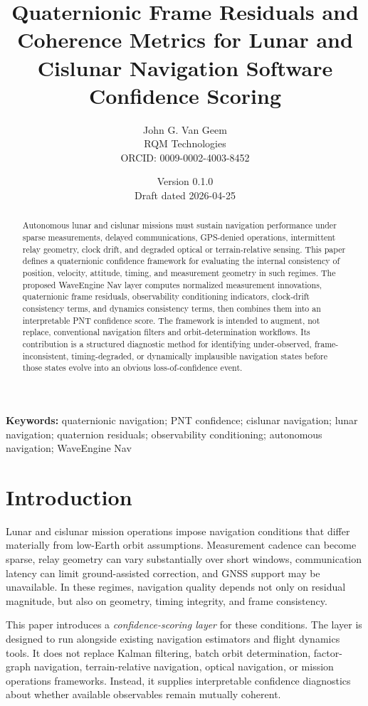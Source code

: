 \documentclass[11pt]{article}
\title{\textbf{Quaternionic Frame Residuals and Coherence Metrics for Lunar and Cislunar Navigation Software Confidence Scoring}}
\author{John G. Van Geem\\
RQM Technologies\\
ORCID: 0009-0002-4003-8452}
\date{Version 0.1.0 \\ Draft dated 2026-04-25}
\theoremstyle{remark}
\begin{document}
\maketitle

\begin{abstract}
Autonomous lunar and cislunar missions must sustain navigation performance under sparse measurements, delayed communications, GPS-denied operations, intermittent relay geometry, clock drift, and degraded optical or terrain-relative sensing. This paper defines a quaternionic confidence framework for evaluating the internal consistency of position, velocity, attitude, timing, and measurement geometry in such regimes. The proposed WaveEngine Nav layer computes normalized measurement innovations, quaternionic frame residuals, observability conditioning indicators, clock-drift consistency terms, and dynamics consistency terms, then combines them into an interpretable PNT confidence score. The framework is intended to augment, not replace, conventional navigation filters and orbit-determination workflows. Its contribution is a structured diagnostic method for identifying under-observed, frame-inconsistent, timing-degraded, or dynamically implausible navigation states before those states evolve into an obvious loss-of-confidence event.
\end{abstract}

\noindent\textbf{Keywords:} quaternionic navigation; PNT confidence; cislunar navigation; lunar navigation; quaternion residuals; observability conditioning; autonomous navigation; WaveEngine Nav

\section{Introduction}

Lunar and cislunar mission operations impose navigation conditions that differ materially from low-Earth orbit assumptions. Measurement cadence can become sparse, relay geometry can vary substantially over short windows, communication latency can limit ground-assisted correction, and GNSS support may be unavailable. In these regimes, navigation quality depends not only on residual magnitude, but also on geometry, timing integrity, and frame consistency.

This paper introduces a \emph{confidence-scoring layer} for these conditions. The layer is designed to run alongside existing navigation estimators and flight dynamics tools. It does not replace Kalman filtering, batch orbit determination, factor-graph navigation, terrain-relative navigation, optical navigation, or mission operations frameworks. Instead, it supplies interpretable confidence diagnostics about whether available observables remain mutually coherent.
\end{document}
